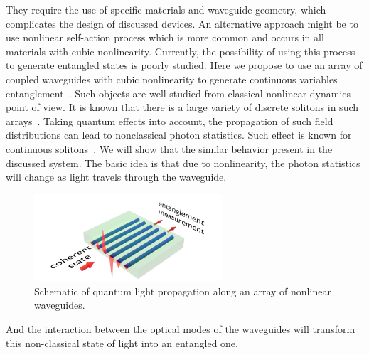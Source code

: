 \documentclass{osa-article}
\begin{document}
They require the use of specific materials and waveguide geometry, which complicates the design of discussed devices. 
An alternative approach might be to use nonlinear self-action process which is more common and occurs in all materials with cubic nonlinearity. 
Currently, the possibility of using this process to generate entangled states is poorly studied. 
Here we propose to use an array of coupled waveguides with cubic nonlinearity to generate continuous variables entanglement~\cite{weedbrook_gaussian_2012}. 
Such objects are well studied from classical nonlinear dynamics point of view. 
It is known that there is a large variety of discrete solitons in such arrays~\cite{kevrekidis_discrete_2009, christodoulides_discretizing_2003}.
Taking quantum effects into account, the propagation of such field distributions can lead to nonclassical photon statistics. 
Such effect is known for continuous solitons~\cite{corney_quantum_2001, lai_entangled_2009}.
We will show that the similar behavior present in the discussed system.
The basic idea is that due to nonlinearity, the photon statistics will change as light travels through the waveguide.
\begin{figure}[h!]
	\centering\includegraphics[width=7cm]{fig1}
	\caption{Schematic of quantum light propagation along an array of nonlinear waveguides.}
	\label{fig:schema}
\end{figure}
And the interaction between the optical modes of the waveguides will transform this non-classical state of light into an entangled one. 
\end{document}
